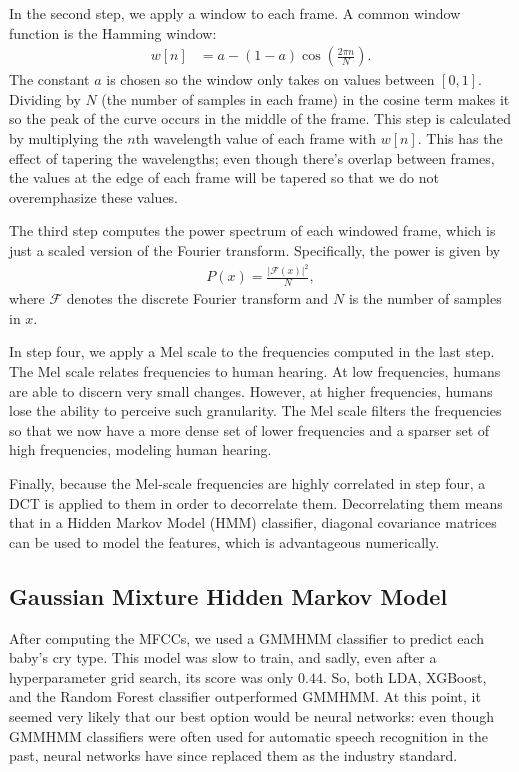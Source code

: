 \documentclass[11pt]{article}
\begin{document}
In the second step, we apply a window to each frame.
A common window function is the Hamming window: \begin{align*}
    w[n] &= a - (1 - a) \cos \left ( \frac{2 \pi n}{N} \right).
\end{align*}
The constant $ a $ is chosen so the window only takes on values between $ [0, 1] $.
Dividing by $ N $ (the number of samples in each frame) in the cosine term makes it so the peak of the curve occurs in the middle of the frame.
This step is calculated by multiplying the $ n $th wavelength value of each frame with $ w[n] $.
This has the effect of tapering the wavelengths; even though there's overlap between frames, the values at the edge of each frame will be tapered so that we do not overemphasize these values.

The third step computes the power spectrum of each windowed frame, which is just a scaled version of the Fourier transform.
Specifically, the power is given by \begin{align*}
    P(x) = \frac{|\mathscr{F}(x)|^2}{N},
\end{align*}
where $ \mathscr{F} $ denotes the discrete Fourier transform and $ N $ is the number of samples in $ x $.

In step four, we apply a Mel scale to the frequencies computed in the last step.
The Mel scale relates frequencies to human hearing.
At low frequencies, humans are able to discern very small changes.
However, at higher frequencies, humans lose the ability to perceive such granularity.
The Mel scale filters the frequencies so that we now have a more dense set of lower frequencies and a sparser set of high frequencies, modeling human hearing.

Finally, because the Mel-scale frequencies are highly correlated in step four, a DCT is applied to them in order to decorrelate them.
Decorrelating them means that in a Hidden Markov Model (HMM) classifier, diagonal covariance matrices can be used to model the features, which is advantageous numerically.

\subsection{Gaussian Mixture Hidden Markov Model}
After computing the MFCCs, we used a GMMHMM classifier to predict each baby's cry type.
This model was slow to train, and sadly, even after a hyperparameter grid search, its score was only $ 0.44 $.
So, both LDA, XGBoost, and the Random Forest classifier outperformed GMMHMM.
At this point, it seemed very likely that our best option would be neural networks:
even though GMMHMM classifiers were often used for automatic speech recognition in the past, neural networks have since replaced them as the industry standard.
\end{document}
